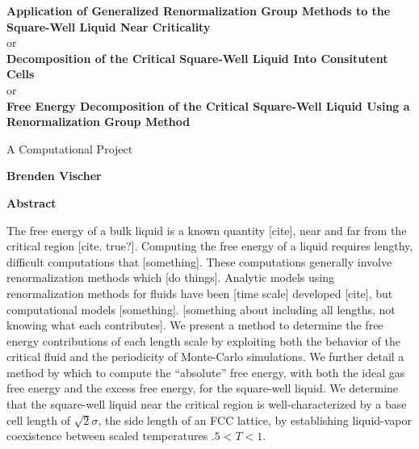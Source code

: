 \thispagestyle{plain}
\begin{center}
    \Large
    \textbf{Application of Generalized Renormalization Group Methods to the Square-Well Liquid Near Criticality}
    \\or\\
    \textbf{Decomposition of the Critical Square-Well Liquid Into Consitutent Cells}    \\or\\
    \textbf{Free Energy Decomposition of the Critical Square-Well Liquid Using a Renormalization Group Method}
   
    \vspace{0.8cm}
    \large
    A Computational Project
    
    \vspace{0.8cm}
    \textbf{Brenden Vischer}
    
    \vspace{1.2cm}
    \textbf{Abstract}
\end{center}

The free energy of a bulk liquid is a known quantity [cite], near and far from the critical region [cite. true?]. Computing the free energy of a liquid requires lengthy, difficult computations that [something]. These computations generally involve renormalization methods which [do things]. Analytic models using renormalization methods for fluids have been [time scale] developed [cite], but computational models [something]. [something about including all lengths, not knowing what each contributes]. We present a method to determine the free energy contributions of each length scale by exploiting both the behavior of the critical fluid and the periodicity of Monte-Carlo simulations. We further detail a method by which to compute the ``absolute'' free energy, with both the ideal gas free energy and the excess free energy, for the square-well liquid. We determine that the square-well liquid near the critical region is well-characterized by a base cell length of $\sqrt2\sigma$, the side length of an FCC lattice, by establishing liquid-vapor coexistence between scaled temperatures $.5 < T < 1$.   
\clearpage